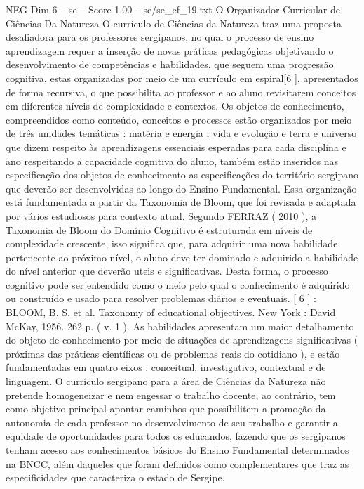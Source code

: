 \begin{textsample}{NEG Dim 6 – se – Score 1.00 – se/se\_ef\_19.txt}  \label{ex:f6_neg_244}
O Organizador Curricular de Ciências Da Natureza O currículo de Ciências da Natureza traz uma proposta desafiadora para os professores sergipanos, no qual o processo de ensino aprendizagem requer a inserção de novas práticas pedagógicas objetivando o desenvolvimento de competências e habilidades, que seguem uma progressão cognitiva, estas organizadas por meio de um currículo em espiral[6 ], apresentados de forma recursiva, o que possibilita ao professor e ao aluno revisitarem conceitos em diferentes níveis de complexidade e contextos.
Os objetos de conhecimento, compreendidos como conteúdo, conceitos e processos estão organizados por meio de três unidades temáticas : matéria e energia ; vida e evolução e terra e universo que dizem respeito às aprendizagens essenciais esperadas para cada disciplina e ano respeitando a capacidade cognitiva do aluno, também estão inseridos nas especificação dos objetos de conhecimento as especificações do território sergipano que deverão ser desenvolvidas ao longo do Ensino Fundamental.
Essa organização está fundamentada a partir da Taxonomia de Bloom, que foi revisada e adaptada por vários estudiosos para contexto atual.
Segundo FERRAZ ( 2010 ), a Taxonomia de Bloom do Domínio Cognitivo é estruturada em níveis de complexidade crescente, isso significa que, para adquirir uma nova habilidade pertencente ao próximo nível, o aluno deve ter dominado e adquirido a habilidade do nível anterior que deverão uteis e significativas.
Desta forma, o processo cognitivo pode ser entendido como o meio pelo qual o conhecimento é adquirido ou construído e usado para resolver problemas diários e eventuais. [ 6 ] : BLOOM, B.
S. et al.
Taxonomy of educational objectives.
New York : David McKay, 1956. 262 p. ( v. 1 ).
As habilidades apresentam um maior detalhamento do objeto de conhecimento por meio de situações de aprendizagens significativas ( próximas das práticas científicas ou de problemas reais do cotidiano ), e estão fundamentadas em quatro eixos : conceitual, investigativo, contextual e de linguagem.
O currículo sergipano para a área de Ciências da Natureza não pretende homogeneizar e nem engessar o trabalho docente, ao contrário, tem como objetivo principal apontar caminhos que possibilitem a promoção da autonomia de cada professor no desenvolvimento de seu trabalho e garantir a equidade de oportunidades para todos os educandos, fazendo que os sergipanos tenham acesso aos conhecimentos básicos do Ensino Fundamental determinados na BNCC, além daqueles que foram definidos como complementares que traz as especificidades que caracteriza o estado de Sergipe.

\end{textsample}
